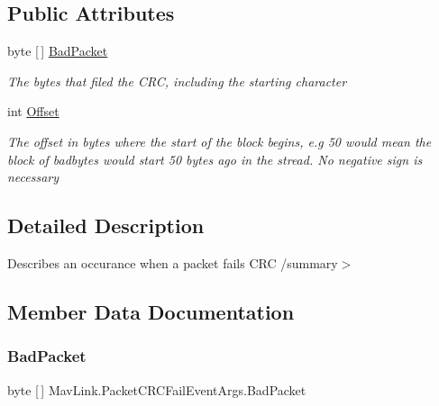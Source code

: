 \subsection*{Public Attributes}
\begin{DoxyCompactItemize}
\item 
byte \mbox{[}$\,$\mbox{]} \hyperlink{classMavLink_1_1PacketCRCFailEventArgs_afd82c1af031117d7d64a27fc2c5d24a5}{Bad\+Packet}
\begin{DoxyCompactList}\small\item\em The bytes that filed the C\+RC, including the starting character \end{DoxyCompactList}\item 
int \hyperlink{classMavLink_1_1PacketCRCFailEventArgs_a1313cf99a833ab9967fc1e6301f52eb0}{Offset}
\begin{DoxyCompactList}\small\item\em The offset in bytes where the start of the block begins, e.\+g 50 would mean the block of badbytes would start 50 bytes ago in the stread. No negative sign is necessary \end{DoxyCompactList}\end{DoxyCompactItemize}


\subsection{Detailed Description}
Describes an occurance when a packet fails C\+RC /summary$>$ 

\subsection{Member Data Documentation}
\mbox{\label{classMavLink_1_1PacketCRCFailEventArgs_afd82c1af031117d7d64a27fc2c5d24a5}} 
\subsubsection{\texorpdfstring{Bad\+Packet}{BadPacket}}
{\footnotesize\ttfamily byte \mbox{[}$\,$\mbox{]} Mav\+Link.\+Packet\+C\+R\+C\+Fail\+Event\+Args.\+Bad\+Packet}



